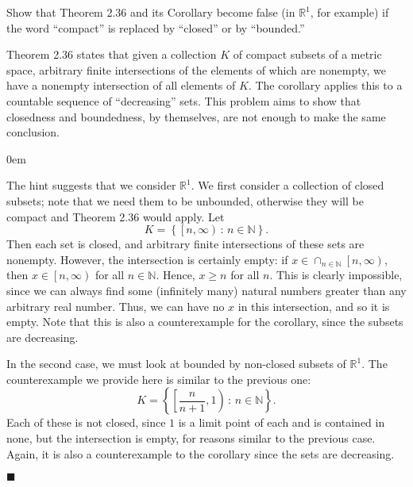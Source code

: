 \documentclass[12pt]{article}
\renewcommand{\qed}{\hfill$\blacksquare$}
\renewenvironment{proof}{\begin{addmargin}[1em]{0em}\begin{newproof}}{\end{newproof}\end{addmargin}\qed}
\newenvironment{problem}[2][Exercise]{\begin{trivlist}
\item[\hskip \labelsep {\bfseries #1}\hskip \labelsep {\bfseries #2.}]}{\end{trivlist}}
\begin{document}
\begin{problem}{2.15}
Show that Theorem 2.36 and its Corollary become false (in $\mathbb{R}^1$, for example) if the word ``compact'' is replaced by ``closed'' or by ``bounded.''
\end{problem}
{\color{red}Theorem 2.36 states that given a collection $K$ of compact subsets of a metric space, arbitrary finite intersections of the elements of which are nonempty, we have a nonempty intersection of all elements of $K$. The corollary applies this to a countable sequence of ``decreasing'' sets. This problem aims to show that closedness and boundedness, by themselves, are not enough to make the same conclusion.}
\begin{proof}
The hint suggests that we consider $\mathbb{R}^1$. We first consider a collection of closed subsets; note that we need them to be unbounded, otherwise they will be compact and Theorem 2.36 would apply. Let $$ K = \left\{ \left[n, \infty\right) \, : \, n\in \mathbb{N}\right\}. $$ Then each set is closed, and arbitrary finite intersections of these sets are nonempty. However, the intersection is certainly empty: if $x \in \cap_{n\in \mathbb{N}} \left[n,\infty\right)$, then $x \in \left[n,\infty\right)$ for all $n\in \mathbb{N}$. Hence, $x\geq n$ for all $n$. This is clearly impossible, since we can always find some (infinitely many) natural numbers greater than any arbitrary real number. Thus, we can have no $x$ in this intersection, and so it is empty. Note that this is also a counterexample for the corollary, since the subsets are decreasing.

In the second case, we must look at bounded by non-closed subsets of $\mathbb{R}^1$. The counterexample we provide here is similar to the previous one: $$K = \left\{ \left[\frac{n}{n+1},1\right) \, : \, n\in \mathbb{N}\right\}.$$ Each of these is not closed, since $1$ is a limit point of each and is contained in none, but the intersection is empty, for reasons similar to the previous case. Again, it is also a counterexample to the corollary since the sets are decreasing.
\end{proof}
\end{document}
